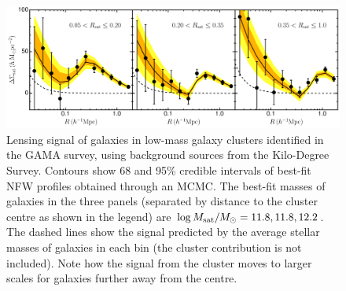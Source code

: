 \documentclass[12pt]{article}
\begin{document}
\begin{figure}
 \centerline{\includegraphics[width=6in]{esd_kids.pdf}}
\caption{\small Lensing signal of galaxies in low-mass galaxy clusters identified in the GAMA survey, using background sources from the Kilo-Degree Survey. Contours show 68 and 95\% credible intervals of best-fit NFW profiles obtained through an MCMC. The best-fit masses of galaxies in the three panels (separated by distance to the cluster centre as shown in the legend) are $\log M_{\rm sat}/M_\odot=11.8,11.8,12.2$. The dashed lines show the signal predicted by the average stellar masses of galaxies in each bin (the cluster contribution is not included). Note how the signal from the cluster moves to larger scales for galaxies further away from the centre.}
\end{figure}
\end{document}
